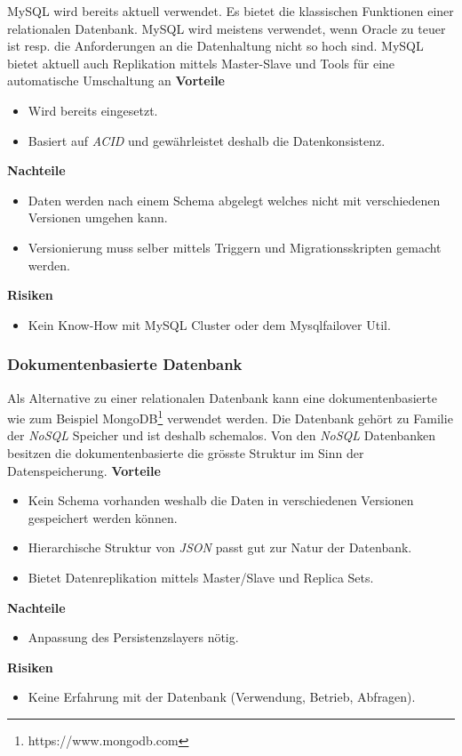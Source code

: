 MySQL wird bereits aktuell verwendet. Es bietet die klassischen Funktionen einer relationalen Datenbank. MySQL wird meistens verwendet, wenn Oracle zu teuer ist resp. die Anforderungen an die Datenhaltung nicht so hoch sind. MySQL bietet aktuell auch Replikation mittels Master-Slave und Tools für eine automatische Umschaltung an
\newline
\newline
\textbf{Vorteile}
\begin{itemize}
	\item Wird bereits eingesetzt.
	\item Basiert auf \textit{\gls{ACID}} und gewährleistet deshalb die Datenkonsistenz.
\end{itemize}
\textbf{Nachteile}
\begin{itemize}
	\item Daten werden nach einem Schema abgelegt welches nicht mit verschiedenen Versionen umgehen kann.
	\item Versionierung muss selber mittels Triggern und Migrationsskripten gemacht werden.
\end{itemize}
\textbf{Risiken}
\begin{itemize}
	\item Kein Know-How mit MySQL Cluster oder dem Mysqlfailover Util.
\end{itemize}

\subsubsection{Dokumentenbasierte Datenbank}

Als Alternative zu einer relationalen Datenbank kann eine dokumentenbasierte wie zum Beispiel MongoDB\footnote{https://www.mongodb.com} verwendet werden. Die Datenbank gehört zu Familie der \textit{\gls{NoSQL}} Speicher und ist deshalb schemalos. Von den \textit{\gls{NoSQL}} Datenbanken besitzen die dokumentenbasierte die grösste Struktur im Sinn der Datenspeicherung.
\newline
\newline
\textbf{Vorteile}
\begin{itemize}
	\item Kein Schema vorhanden weshalb die Daten in verschiedenen Versionen gespeichert werden können.
	\item Hierarchische Struktur von \textit{\gls{JSON}} passt gut zur Natur der Datenbank.
	\item Bietet Datenreplikation mittels Master/Slave und Replica Sets.
\end{itemize}
\textbf{Nachteile}
\begin{itemize}
	\item Anpassung des Persistenzslayers nötig.
\end{itemize}
\textbf{Risiken}
\begin{itemize}
	\item Keine Erfahrung mit der Datenbank (Verwendung, Betrieb, Abfragen).
\end{itemize}
\newpage
